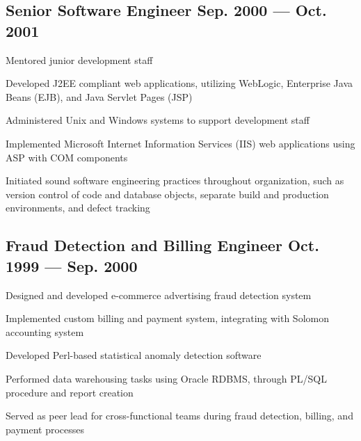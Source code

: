 \documentclass[letter,10pt]{article}
\begin{document}
\subsection{Senior Software Engineer \hfill \textrm{\textmd{Sep. 2000 --- Oct. 2001}}}
\begin{zitemize}
	\item Mentored junior development staff
	\item Developed J2EE compliant web applications, utilizing
	WebLogic, Enterprise Java Beans (EJB), and Java Servlet
	Pages (JSP)
	\item Administered Unix and Windows systems to support
	development staff
	\item Implemented Microsoft Internet Information Services (IIS)
	web applications using ASP with COM components
	\item Initiated sound software engineering practices throughout
	organization, such as version control of code and
	database objects, separate build and production
	environments, and defect tracking
\end{zitemize}

\subsection{Fraud Detection and Billing Engineer \hfill \textrm{\textmd{Oct. 1999 --- Sep. 2000}}}
\begin{zitemize}
	\item Designed and developed e-commerce advertising fraud
	detection system
	\item Implemented custom billing and payment system, integrating
	with Solomon accounting system
	\item Developed Perl-based statistical anomaly detection
	software
	\item Performed data warehousing tasks using Oracle RDBMS,
	through PL/SQL procedure and report creation
	\item Served as peer lead for cross-functional teams during
	fraud detection, billing, and payment processes
\end{zitemize}

\end{document}
